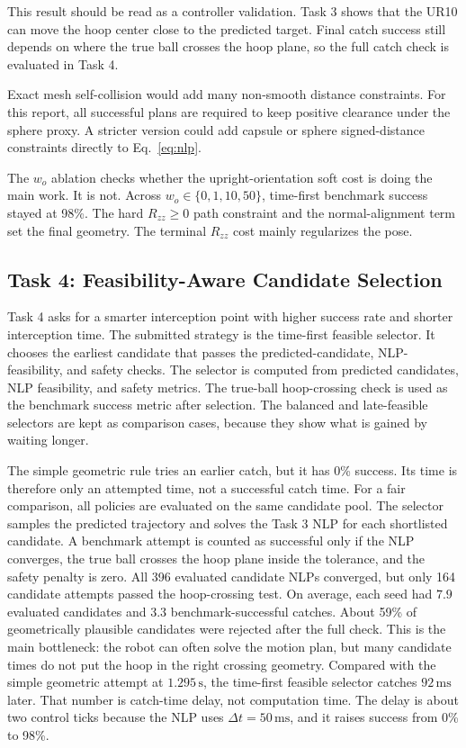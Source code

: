 \documentclass[a4paper,10pt]{article}
\begin{document}
This result should be read as a controller validation. Task 3 shows that the UR10 can move the hoop center close to the predicted target. Final catch success still depends on where the true ball crosses the hoop plane, so the full catch check is evaluated in Task 4.

Exact mesh self-collision would add many non-smooth distance constraints. For this report, all successful plans are required to keep positive clearance under the sphere proxy. A stricter version could add capsule or sphere signed-distance constraints directly to Eq.~\ref{eq:nlp}.

The \(w_o\) ablation checks whether the upright-orientation soft cost is doing the main work. It is not. Across \(w_o\in\{0,1,10,50\}\), time-first benchmark success stayed at 98\%. The hard \(R_{zz}\ge0\) path constraint and the normal-alignment term set the final geometry. The terminal \(R_{zz}\) cost mainly regularizes the pose.

\subsection*{Task 4: Feasibility-Aware Candidate Selection}

Task 4 asks for a smarter interception point with higher success rate and shorter interception time. The submitted strategy is the time-first feasible selector. It chooses the earliest candidate that passes the predicted-candidate, NLP-feasibility, and safety checks. The selector is computed from predicted candidates, NLP feasibility, and safety metrics. The true-ball hoop-crossing check is used as the benchmark success metric after selection. The balanced and late-feasible selectors are kept as comparison cases, because they show what is gained by waiting longer.

The simple geometric rule tries an earlier catch, but it has 0\% success. Its time is therefore only an attempted time, not a successful catch time. For a fair comparison, all policies are evaluated on the same candidate pool. The selector samples the predicted trajectory and solves the Task 3 NLP for each shortlisted candidate. A benchmark attempt is counted as successful only if the NLP converges, the true ball crosses the hoop plane inside the tolerance, and the safety penalty is zero. All 396 evaluated candidate NLPs converged, but only 164 candidate attempts passed the hoop-crossing test. On average, each seed had \(7.9\) evaluated candidates and \(3.3\) benchmark-successful catches. About 59\% of geometrically plausible candidates were rejected after the full check. This is the main bottleneck: the robot can often solve the motion plan, but many candidate times do not put the hoop in the right crossing geometry. Compared with the simple geometric attempt at \(1.295\,\mathrm{s}\), the time-first feasible selector catches \(92\,\mathrm{ms}\) later. That number is catch-time delay, not computation time. The delay is about two control ticks because the NLP uses \(\Delta t=50\,\mathrm{ms}\), and it raises success from 0\% to 98\%.
\end{document}
